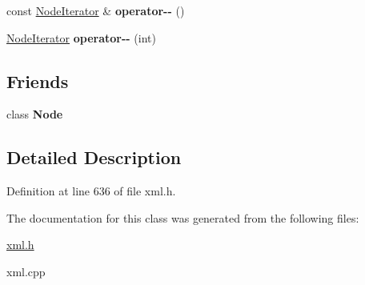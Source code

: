 \begin{DoxyCompactItemize}
\item 
\hypertarget{classphys_1_1xml_1_1NodeIterator_a9d0ace0a01c3ea0a0ff2ed389b4a5141}{
const \hyperlink{classphys_1_1xml_1_1NodeIterator}{NodeIterator} \& {\bfseries operator-\/-\/} ()}
\label{da/d4f/classphys_1_1xml_1_1NodeIterator_a9d0ace0a01c3ea0a0ff2ed389b4a5141}

\item 
\hypertarget{classphys_1_1xml_1_1NodeIterator_a4775254b1fbfc2e10a6024241be55f6a}{
\hyperlink{classphys_1_1xml_1_1NodeIterator}{NodeIterator} {\bfseries operator-\/-\/} (int)}
\label{da/d4f/classphys_1_1xml_1_1NodeIterator_a4775254b1fbfc2e10a6024241be55f6a}

\end{DoxyCompactItemize}
\subsection*{Friends}
\begin{DoxyCompactItemize}
\item 
\hypertarget{classphys_1_1xml_1_1NodeIterator_a6db9d28bd448a131448276ee03de1e6d}{
class {\bfseries Node}}
\label{da/d4f/classphys_1_1xml_1_1NodeIterator_a6db9d28bd448a131448276ee03de1e6d}

\end{DoxyCompactItemize}


\subsection{Detailed Description}


Definition at line 636 of file xml.h.



The documentation for this class was generated from the following files:\begin{DoxyCompactItemize}
\item 
\hyperlink{xml_8h}{xml.h}\item 
xml.cpp\end{DoxyCompactItemize}
